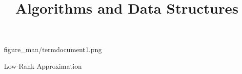 \documentclass[11pt,compress,t,notes=noshow, xcolor=table]{beamer}
\title{Algorithms and Data Structures}
\begin{document}
{figure_man/termdocument1.png}
{
  \item Low-Rank Approximation
}

% 
% 


\end{document}
